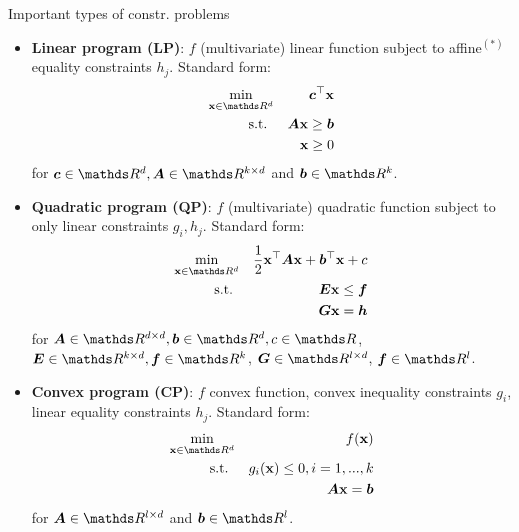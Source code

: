 \documentclass[11pt,compress,t,notes=noshow, xcolor=table]{beamer}
\begin{document}
\begin{vbframe}{Important types of constr. problems}

\vspace*{-0.3cm}

\begin{itemize}
	\item \textbf{Linear program (LP)}: $f$ (multivariate) linear function subject to affine$^{(*)}$ equality constraints $h_j$. Standard form: 
	\vspace*{-0.2cm}
	\begin{eqnarray*}
	\min_{\xv \in \R^d} && \bm{c}^\top\xv\\
	\text{s.t. } && \bm{A}\xv \ge \bm{b} \\
	&& \xv \ge 0
	\end{eqnarray*}
	for $\bm{c}\in \R^d, \bm{A} \in \R^{k \times d}$ and $\bm{b} \in \R^k$. 
	\item \textbf{Quadratic program (QP)}: $f$ (multivariate) quadratic function subject to only linear constraints $g_i, h_j$. Standard form: 
	\vspace*{-0.3cm}
	\begin{eqnarray*}
	\min_{\xv \in \R^d} && \frac{1}{2} \xv^\top \bm{A} \xv + \bm{b}^\top \xv 
	+ c \\
	\text{s.t. } && \bm{E}\xv \le \bm{f} \\
	 && \bm{G}\xv = \bm{h} \\
	\end{eqnarray*}
	for $\bm{A} \in \R^{d \times d}, \bm{b} \in \R^d, c \in \R$, $\bm{E} \in \R^{k \times d}, \bm{f} \in \R^k$, $\bm{G} \in \R^{l \times d}$, $\bm{f} \in \R^l$. 
\end{itemize}
 


\framebreak  

\begin{itemize}
	\item \textbf{Convex program (CP)}: $f$ convex function, convex inequality constraints $g_i$, linear equality constraints $h_j$. Standard form: 
	\vspace*{-0.2cm}
	\begin{eqnarray*}
	\min_{\xv \in \R^d} && \fx\\
	\text{s.t. } && g_i(\xv) \le 0, i = 1, ..., k \\
	&& \bm{A}\xv = \bm{b}
	\end{eqnarray*}
	for $\bm{A} \in \R^{l \times d}$ and $\bm{b} \in \R^l$. 
\end{itemize}


\end{vbframe}
\end{document}
